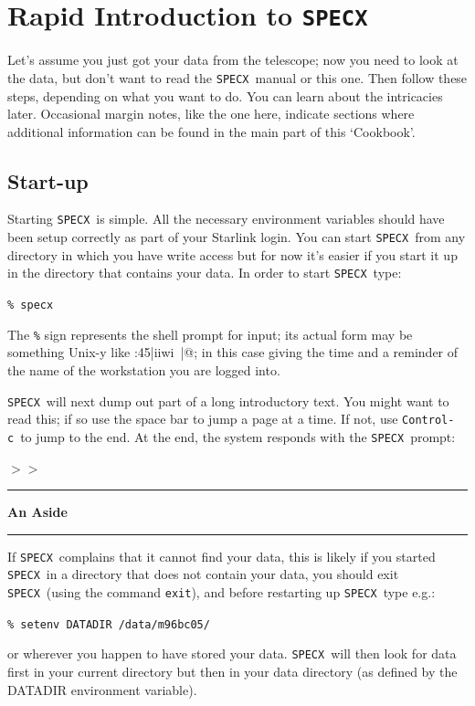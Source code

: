 \documentclass[11pt,twoside]{article}
\newcommand{\xlabel}[1]{}
\newcommand{\SPECX}{{\tt SPECX}}
\newcommand{\margnote}[1]
{\marginpar{({\it{\ref{#1}}})}}
\newcommand{\SP}{{$>\!>$}}
\newcommand{\aside}
{\begin{center}\rule[1mm]{1.0in}{0.015in}\hspace*{2mm}
{\bf An Aside}
\hspace*{2mm}\rule[1mm]{1.0in}{0.015in}\end{center}\vspace*{-0.2in}}
\newcommand{\ctrlc}{{\tt Control-c}}
\begin{document}
\section{\xlabel{rapid_introduction_to_specx}Rapid Introduction to \SPECX }
\label{sec:rapid-specx}
Let's assume you just got your data from the telescope;
now you need to
look at the data, but don't want to read the \SPECX\ manual or this
one. Then follow these steps, depending on what you want to do. You
can learn about the intricacies later. Occasional margin notes, like
the one here\margnote{sec:specx-intro}, indicate sections where
additional information can be found in the main part of this
`Cookbook'.

\subsection{Start-up}
\label{sec:start-up}
\margnote{sec:finding-the-data}

Starting \SPECX\ is simple. All the necessary environment variables should
have been setup correctly as part of your Starlink login.
You can start \SPECX\ from any directory in which you have write access but
for now it's easier if you start it up in the directory that contains your
data. In order to start \SPECX\, type:

\verb|% specx|

\reversemarginpar
The {\tt \%} sign represents the shell prompt for input; its actual
form may be something Unix-y like :45|iiwi~|@; in this case
giving the time and a reminder of the name of the workstation you are
logged into.

\SPECX\ will next dump out part of a long introductory
text. You might want to read this; if so use the space bar to jump a
page at a time. If not, use \ctrlc\ to jump to the end. At the end,
the system responds with the \SPECX\ prompt:

\SP

\aside
If \SPECX\ complains that it cannot find your data, this is likely
if you started \SPECX\ in a directory that does not contain your data,
you
should exit \SPECX\ (using the command {\tt{exit}}), and before
restarting up \SPECX\ type e.g.:

\verb|% setenv DATADIR /data/m96bc05/|

or wherever you happen to have stored your data. \SPECX\ will then
look for data first in your current directory but then in your data
directory (as defined by the DATADIR environment variable).
\end{document}
